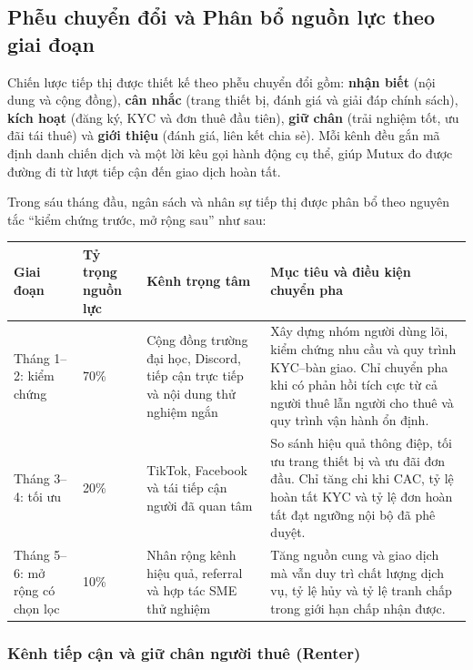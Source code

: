 \subsection{Phễu chuyển đổi và Phân bổ nguồn lực theo giai đoạn}

Chiến lược tiếp thị được thiết kế theo phễu chuyển đổi gồm: \textbf{nhận biết} (nội dung và cộng đồng), \textbf{cân nhắc} (trang thiết bị, đánh giá và giải đáp chính sách), \textbf{kích hoạt} (đăng ký, KYC và đơn thuê đầu tiên), \textbf{giữ chân} (trải nghiệm tốt, ưu đãi tái thuê) và \textbf{giới thiệu} (đánh giá, liên kết chia sẻ). Mỗi kênh đều gắn mã định danh chiến dịch và một lời kêu gọi hành động cụ thể, giúp Mutux đo được đường đi từ lượt tiếp cận đến giao dịch hoàn tất.

Trong sáu tháng đầu, ngân sách và nhân sự tiếp thị được phân bổ theo nguyên tắc ``kiểm chứng trước, mở rộng sau'' như sau:

\begin{longtable}{@{}p{}p{}p{}p{}@{}}
\toprule
\textbf{Giai đoạn} & \textbf{Tỷ trọng nguồn lực} & \textbf{Kênh trọng tâm} & \textbf{Mục tiêu và điều kiện chuyển pha} \\
\midrule
\endhead
Tháng 1--2: kiểm chứng & 70\% & Cộng đồng trường đại học, Discord, tiếp cận trực tiếp và nội dung thử nghiệm ngắn & Xây dựng nhóm người dùng lõi, kiểm chứng nhu cầu và quy trình KYC--bàn giao. Chỉ chuyển pha khi có phản hồi tích cực từ cả người thuê lẫn người cho thuê và quy trình vận hành ổn định. \\
Tháng 3--4: tối ưu & 20\% & TikTok, Facebook và tái tiếp cận người đã quan tâm & So sánh hiệu quả thông điệp, tối ưu trang thiết bị và ưu đãi đơn đầu. Chỉ tăng chi khi CAC, tỷ lệ hoàn tất KYC và tỷ lệ đơn hoàn tất đạt ngưỡng nội bộ đã phê duyệt. \\
Tháng 5--6: mở rộng có chọn lọc & 10\% & Nhân rộng kênh hiệu quả, referral và hợp tác SME thử nghiệm & Tăng nguồn cung và giao dịch mà vẫn duy trì chất lượng dịch vụ, tỷ lệ hủy và tỷ lệ tranh chấp trong giới hạn chấp nhận được. \\
\bottomrule
\end{longtable}

\subsubsection{Kênh tiếp cận và giữ chân người thuê (Renter)}

